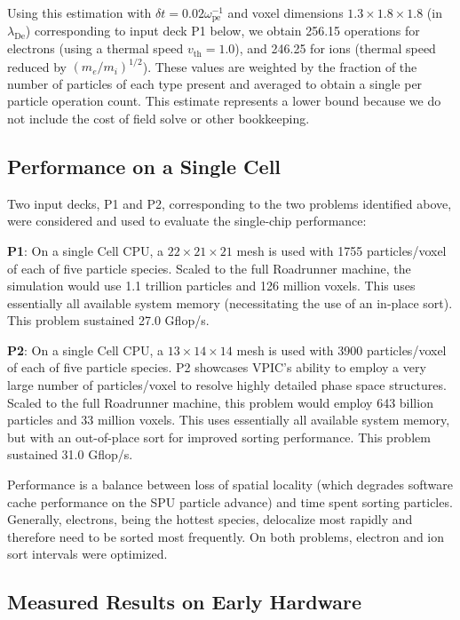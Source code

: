 \documentclass[letter,10pt]{article}
\newcommand{\lde}      {\lambda_{\mathrm{De}}}
\newcommand{\wpe}      {\omega_{\mathrm{pe}}}
\begin{document}
Using this estimation with $\delta t = 0.02 \wpe^{-1}$ and voxel 
dimensions $1.3 \times 1.8 \times 1.8$ (in $\lde$) corresponding to
input deck P1 below, we obtain 
256.15 operations for electrons (using a thermal speed $v_{\mathrm{th}} =
1.0$), and 246.25 for ions (thermal speed reduced by
$(m_e/m_i)^{1/2}$).  These values are weighted by the fraction of 
the number of particles of each type present and averaged to obtain 
a single per particle operation count.  This estimate represents a 
lower bound because we do not include the cost of field solve or 
other bookkeeping.

\subsection{Performance on a Single Cell}

Two input decks, P1 and P2, corresponding to the two problems
identified above, were considered and used to evaluate the
single-chip performance:

\textbf{P1}:  On a single Cell CPU, a $22 \times 21 \times 21$ mesh 
is used with 1755 particles/voxel of each of five particle species.
Scaled to the full Roadrunner machine, the simulation would
use 1.1 trillion particles and 126 million voxels.  This uses
essentially all available system memory (necessitating the use of an
in-place sort).  This problem sustained 27.0 Gflop/s.

\textbf{P2}:  On a single Cell CPU, a $13 \times 14 \times 14$ mesh 
is used with 3900 particles/voxel of each of five particle species.
P2 showcases VPIC's ability to employ a very large number of
particles/voxel to resolve highly detailed phase space structures.
Scaled to the full Roadrunner machine, this problem would employ 643
billion particles and 33 million voxels. This uses essentially all
available system memory, but with an out-of-place sort for improved
sorting performance.  This problem sustained 31.0 Gflop/s.

Performance is a balance between loss of spatial locality (which
degrades software cache performance on the SPU particle advance) and
time spent sorting particles.  Generally, electrons, being the hottest
species, delocalize most rapidly and therefore need to be sorted most 
frequently.  On both problems, electron and ion sort intervals were 
optimized.  

\subsection{Measured Results on Early Hardware}
\end{document}

